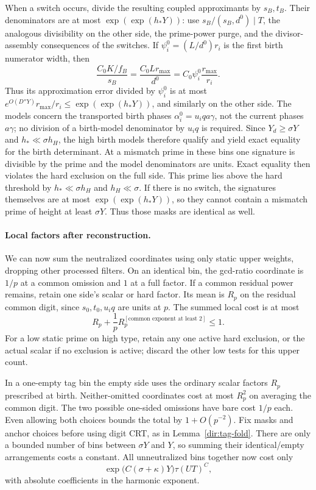 When a switch occurs, divide the resulting coupled approximants by
$s_B,t_B$.  Their denominators are at most
$\exp(\exp(h_*Y))$: use
$s_B/(s_B,d^0)\mid T$, the analogous divisibility on the other side,
the prime-power purge, and the divisor-assembly consequences of the
switches.  If $\psi_i^0=(L/d^0)r_i$ is the first birth numerator
width, then
\[
 \frac{C_0K/f_B}{s_B}
 =\frac{C_0Lr_{\max}}{d^0}
 =C_0\psi_i^0\frac{r_{\max}}{r_i}.
\]
Thus its approximation error divided by $\psi_i^0$ is at most
$e^{O(D''Y)}r_{\max}/r_i\le\exp(\exp(h_*Y))$, and similarly
on the other side.  The models concern the transported birth phases
$\alpha_i^0=u_iqa\gamma$, not the current phases $a\gamma$;
no division of a birth-model denominator by $u_iq$ is required.
Since $Y_d\ge\sigma Y$ and $h_*\ll\sigma h_H$, the high birth
models therefore qualify
and yield exact equality for the birth determinant.  At a mismatch
prime in these bins one signature is divisible by the prime and the
model denominators are units.  Exact equality then violates the hard
exclusion on the full side.  This prime lies above the hard threshold
by $h_*\ll\sigma h_H$ and $h_H\ll\sigma$.
If there is no switch, the signatures themselves are at most
$\exp(\exp(h_*Y))$, so they cannot contain a mismatch prime of height
at least $\sigma Y$.  Thus those masks are identical as well.

\paragraph{Local factors after reconstruction.}
We can now sum the neutralized coordinates using only static upper
weights, dropping other processed filters.  On an identical bin, the
gcd-ratio coordinate is $1/p$ at a common omission and $1$ at a full
factor.  If a common residual power remains, retain one side's scalar
or hard factor.  Its mean is $R_p$ on the residual common digit, since
$s_0,t_0,u_iq$ are units at $p$.  The summed local cost is at most
\[
 R_p+\frac1p R_p^{[\text{common exponent at least }2]}\le1.
\]
For a low static prime on high type, retain any one active hard
exclusion, or the actual scalar if no exclusion is active; discard the
other low tests for this upper count.

In a one-empty tag bin the empty side uses the ordinary scalar factors
$R_p$ prescribed at birth.
Neither-omitted coordinates cost at most $R_p^2$ on averaging the
common digit.  The two possible one-sided omissions have bare cost
$1/p$ each.  Even allowing both choices bounds the total by
$1+O(p^{-2})$.  Fix masks and anchor choices before using digit CRT,
as in Lemma~\ref{dir:tag-fold}.  There are only a bounded number of
bins between $\sigma Y$ and $Y$, so summing their identical/empty
arrangements costs a constant.  All unneutralized bins together now
cost only
\begin{equation}\label{sp:reduced-harmonic-cost}
 \exp\bigl(C(\sigma+\kappa)Y\bigr)\tau(UT)^C,
\end{equation}
with absolute coefficients in the harmonic exponent.


